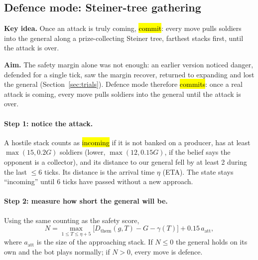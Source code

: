 \subsection{Defence mode: Steiner-tree gathering}\label{sec:defence}

\begin{keyidea}
\textbf{Key idea.} Once an attack is truly coming, \hl{commit}: every move pulls soldiers into the general
along a prize-collecting Steiner tree, farthest stacks first, until the attack is over.
\end{keyidea}

\textbf{Aim.} The safety margin alone was not enough: an earlier version noticed danger, defended for a single
tick, saw the margin recover, returned to expanding and lost the general (Section~\ref{sec:trials}). Defence
mode therefore \hl{commits}: once a real attack is coming, every move pulls soldiers into the general until the
attack is over.

\paragraph{Step 1: notice the attack.} A hostile stack counts as \hl{incoming} if it is not banked on a
producer, has at least $\max(15,0.2G)$ soldiers (lower, $\max(12,0.15G)$, if the belief says the opponent is a
collector), and its distance to our general fell by at least 2 during the last $\le 6$ ticks. Its distance is
the arrival time $\eta$ (ETA). The state stays ``incoming'' until 6 ticks have passed without a new approach.

\paragraph{Step 2: measure how short the general will be.} Using the same counting as the safety score,
\begin{equation}
N=\max_{1\le T\le\eta+5}\Big[D_{\text{them}}(g,T)-G-\gamma(T)\Big]+0.15\,a_{\text{att}},
\end{equation}
where $a_{\text{att}}$ is the size of the approaching stack. If $N\le 0$ the general holds on its own and the bot
plays normally; if $N>0$, every move is defence.

